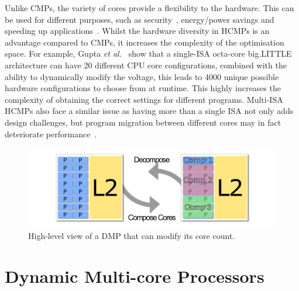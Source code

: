 Unlike CMPs, the variety of cores provide a flexibility to the hardware.
This can be used for different purposes, such as security~\cite{venkatHipstr2016}, energy/power savings and speeding up applications~\cite{venkat2014harnessingisa}.
Whilst the hardware diversity in HCMPs is an advantage compared to CMPs, it increases the complexity of the optimisation space.
For example, Gupta {\it et al.~}\cite{Gupta2017Dypo} show that a single-ISA octa-core big.LITTLE architecture can have 20 different CPU core configurations, combined with the ability to dynamically modify the voltage, this leads to 4000 unique possible hardware configurations to choose from at runtime.
This highly increases the complexity of obtaining the correct settings for different programs.
Multi-ISA HCMPs also face a similar issue as having more than a single ISA not only adds design challenges, but program migration between different cores may in fact deteriorate performance~\cite{DeVuystMigration2012}.

\begin{figure}[t]
    \centering
    \includegraphics[width=1\textwidth]{background/graphics/cmp_new.pdf}
	\vspace{-3em}
    \caption{High-level view of a DMP that can modify its core count.}
    \label{fig:dynmulticore}
	\vspace{-0.5em}
\end{figure}

\vspace{-1em}
\section{Dynamic Multi-core Processors}~\label{sec:dmp}
\vspace{-1em}

